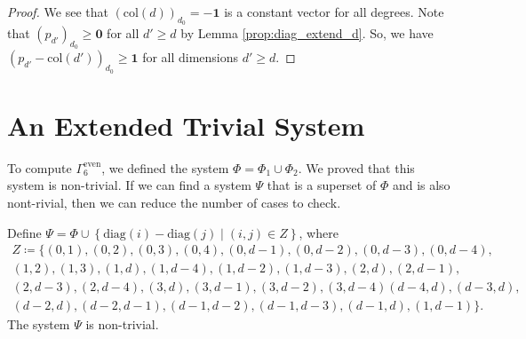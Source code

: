 \begin{proof}
We see that \( (\mathrm{col}(d))_{d_0} = -\mathbf 1 \) is a constant vector for all degrees. Note that \( (p_{d'})_{d_0} \geq \mathbf 0 \) for all \( d' \geq d \) by Lemma \ref{prop:diag_extend_d}. So, we have \( (p_{d'} - \mathrm{col}(d'))_{d_0} \geq \mathbf 1 \) for all dimensions \( d' \geq d \).
\end{proof}
  



\section{An Extended Trivial System}

To compute \(  \Gamma^{\mathrm{even}}_6 \), we defined the system \( \Phi = \Phi_1 \cup \Phi_2 \). We proved that this system is non-trivial. If we can find a system \( \Psi \) that is a superset of \( \Phi \) and is also nont-rivial, then we can reduce the number of cases to check. 

\begin{proposition}
    Define \( \Psi = \Phi \cup \left\{ \mathrm{diag}(i) - \mathrm{diag}(j) \mid (i,j) \in Z \right\} \), where 
    \begin{gather*}
        Z \coloneqq \{ (0,1), (0,2), (0,3), (0,4), (0,d-1), (0,d-2), (0,d-3), (0,d-4),\\ (1,2), (1,3), (1, d), (1,d-4), (1,d-2), (1,d-3), (2,d), (2,d-1),\\ (2,d-3), (2, d-4), (3,d), (3,d-1), (3,d-2), (3, d-4)
        (d-4,d), (d-3,d),\\ (d-2,d), (d-2,d-1), (d-1,d-2), (d-1,d-3), (d-1,d), (1, d-1)\}.
    \end{gather*}
    The system \( \Psi \) is non-trivial.
\end{proposition}

